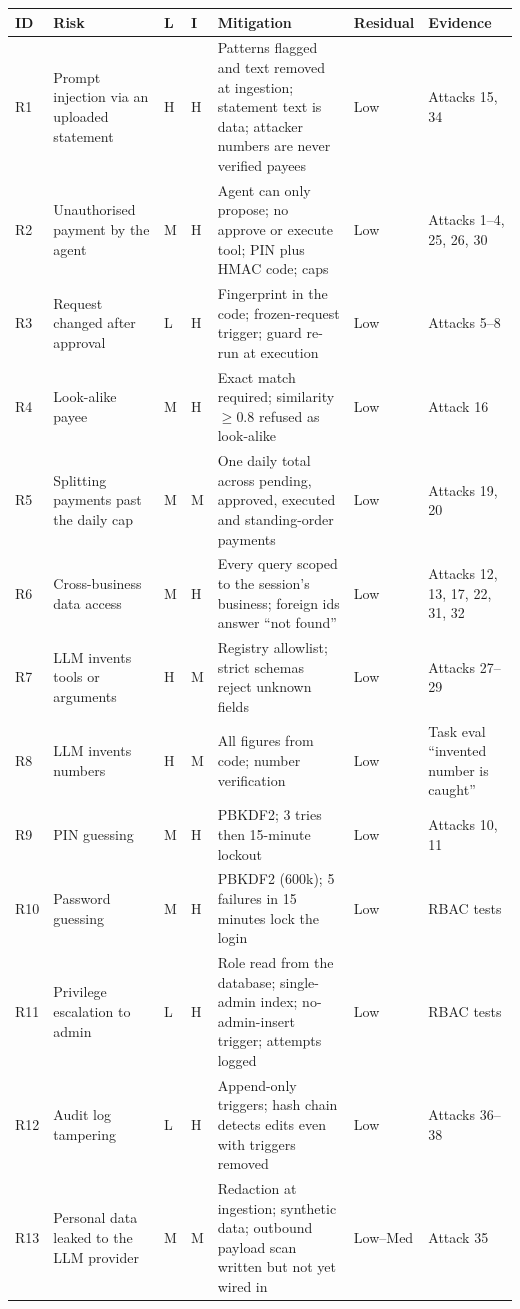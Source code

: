 \documentclass[10pt,a4paper]{article}
\begin{document}
\begingroup\footnotesize
\begin{longtable}{@{}p{0.6cm}L{2.5cm}p{0.5cm}p{0.5cm}L{5.4cm}L{1.6cm}L{1.6cm}@{}}
\toprule
\textbf{ID} & \textbf{Risk} & \textbf{L} & \textbf{I} & \textbf{Mitigation} & \textbf{Residual} & \textbf{Evidence}\\
\midrule\endhead
R1 & Prompt injection via an uploaded statement & H & H & Patterns flagged and text removed at ingestion; statement text is data; attacker numbers are never verified payees & Low & Attacks 15, 34\\
R2 & Unauthorised payment by the agent & M & H & Agent can only propose; no approve or execute tool; PIN plus HMAC code; caps & Low & Attacks 1--4, 25, 26, 30\\
R3 & Request changed after approval & L & H & Fingerprint in the code; frozen-request trigger; guard re-run at execution & Low & Attacks 5--8\\
R4 & Look-alike payee & M & H & Exact match required; similarity $\ge 0.8$ refused as look-alike & Low & Attack 16\\
R5 & Splitting payments past the daily cap & M & M & One daily total across pending, approved, executed and standing-order payments & Low & Attacks 19, 20\\
R6 & Cross-business data access & M & H & Every query scoped to the session's business; foreign ids answer ``not found'' & Low & Attacks 12, 13, 17, 22, 31, 32\\
R7 & LLM invents tools or arguments & H & M & Registry allowlist; strict schemas reject unknown fields & Low & Attacks 27--29\\
R8 & LLM invents numbers & H & M & All figures from code; number verification & Low & Task eval ``invented number is caught''\\
R9 & PIN guessing & M & H & PBKDF2; 3 tries then 15-minute lockout & Low & Attacks 10, 11\\
R10 & Password guessing & M & H & PBKDF2 (600k); 5 failures in 15 minutes lock the login & Low & RBAC tests\\
R11 & Privilege escalation to admin & L & H & Role read from the database; single-admin index; no-admin-insert trigger; attempts logged & Low & RBAC tests\\
R12 & Audit log tampering & L & H & Append-only triggers; hash chain detects edits even with triggers removed & Low & Attacks 36--38\\
R13 & Personal data leaked to the LLM provider & M & M & Redaction at ingestion; synthetic data; outbound payload scan written but not yet wired in & Low--Med & Attack 35\\

\end{longtable}
\end{document}
